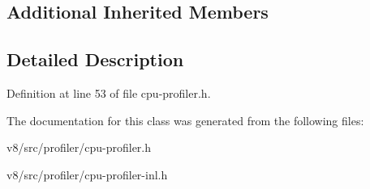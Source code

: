 \subsection*{Additional Inherited Members}


\subsection{Detailed Description}


Definition at line 53 of file cpu-\/profiler.\+h.



The documentation for this class was generated from the following files\+:\begin{DoxyCompactItemize}
\item 
v8/src/profiler/cpu-\/profiler.\+h\item 
v8/src/profiler/cpu-\/profiler-\/inl.\+h\end{DoxyCompactItemize}

